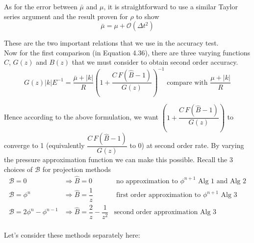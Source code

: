 As for the error between $\bar{\mu}$ and $\mu$, it is straightforward to use a similar Taylor series argument and the result proven for $\rho$ to show 
\begin{equation}
\bar{\mu} = \mu + \mathcal{O}(\Delta t^2)
\end{equation}

These are the two important relations that we use in the accuracy test.\\

Now for the first comparison (in Equation 4.36), there are three varying functions $C$, $G(z)$ and $B(z)$ that we must consider to obtain second order accuracy.
\begin{equation*}
G(z) |k|E^{-1} = \dfrac{\bar{\mu} + |k|}{R}(1 + \dfrac{C \, F(\hat{B} - 1)}{G(z)})^{-1} \text{ compare with } \dfrac{\mu + |k|}{R} 
\end{equation*}

Hence according to the above formulation, we want $(1 + \dfrac{C \, F(\hat{B} - 1)}{G(z)})$ to converge to 1 (equivalently $\dfrac{C \, F(\hat{B} - 1)}{G(z)}$ to 0) at second order rate. By varying the pressure approximation function we can make this possible. Recall the 3 choices of $\mathcal{B}$ for projection methods
\begin{equation}
\begin{array}{lccl}
\mathcal{B} = 0 & \Rightarrow \hat{B}=0 & \text{   no approximation to $\phi^{n+1}$   Alg 1 and Alg 2}\\

\mathcal{B} = \phi^n & \Rightarrow \hat{B} = \dfrac{1}{z} & \text{   first order approximation to $\phi^{n+1}$  Alg 3}\\

\mathcal{B} = 2\phi^n - \phi^{n-1} & \Rightarrow \hat{B} = \dfrac{2}{z} - \dfrac{1}{z^2} &\text{second order approximation  Alg 3}\\
\end{array}
\end{equation}

Let's consider these methods separately here:\\

